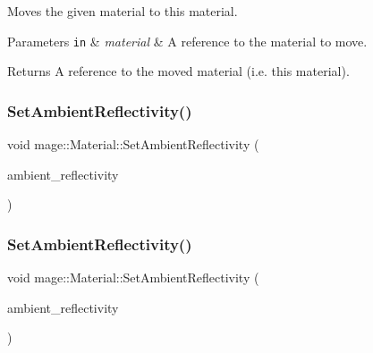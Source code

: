 Moves the given material to this material.


\begin{DoxyParams}[1]{Parameters}
\mbox{\tt in}  & {\em material} & A reference to the material to move. \\
\hline
\end{DoxyParams}
\begin{DoxyReturn}{Returns}
A reference to the moved material (i.\+e. this material). 
\end{DoxyReturn}
\hypertarget{structmage_1_1_material_a7a5cf55e733d2180865d5f6d9758336c}{}\label{structmage_1_1_material_a7a5cf55e733d2180865d5f6d9758336c} 
\subsubsection{\texorpdfstring{Set\+Ambient\+Reflectivity()}{SetAmbientReflectivity()}\hspace{0.1cm}{\footnotesize\ttfamily [1/2]}}
{\footnotesize\ttfamily void mage\+::\+Material\+::\+Set\+Ambient\+Reflectivity (\begin{DoxyParamCaption}\item[{const \hyperlink{structmage_1_1_r_g_b_spectrum}{R\+G\+B\+Spectrum} \&}]{ambient\+\_\+reflectivity }\end{DoxyParamCaption})\hspace{0.3cm}{\ttfamily [noexcept]}}

\hypertarget{structmage_1_1_material_a0c5f2c3a8b79c8498e9501e33acf8147}{}\label{structmage_1_1_material_a0c5f2c3a8b79c8498e9501e33acf8147} 
\subsubsection{\texorpdfstring{Set\+Ambient\+Reflectivity()}{SetAmbientReflectivity()}\hspace{0.1cm}{\footnotesize\ttfamily [2/2]}}
{\footnotesize\ttfamily void mage\+::\+Material\+::\+Set\+Ambient\+Reflectivity (\begin{DoxyParamCaption}\item[{\hyperlink{structmage_1_1_r_g_b_spectrum}{R\+G\+B\+Spectrum} \&\&}]{ambient\+\_\+reflectivity }\end{DoxyParamCaption})\hspace{0.3cm}{\ttfamily [noexcept]}}

